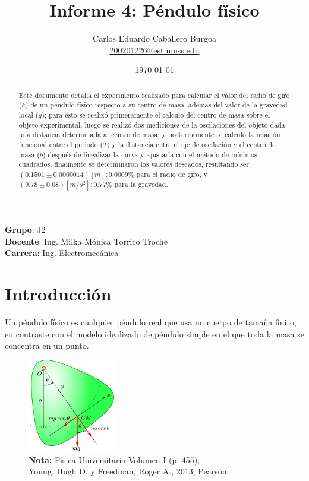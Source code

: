 \documentclass[letter,11pt]{article}
\title{Informe 4: Péndulo físico}
\author{Carlos Eduardo Caballero Burgoa \\
    \small{\href{mailto:200201226@est.umss.edu}{200201226@est.umss.edu}}
}
\date{\today}
\newcommand{\source}[1]{\vspace{-11pt} \caption*{\small{\textbf{Nota:} {#1}}}}
\begin{document}
\maketitle
\begin{center}
    \textbf{Grupo}: J2\\
    \textbf{Docente}: Ing. Milka Mónica Torrico Troche\\
    \textbf{Carrera}: Ing. Electromecánica
\end{center}

\begin{abstract}
Este documento detalla el experimento realizado para calcular el valor del radio
de giro ($k$) de un péndulo físico respecto a su centro de masa, además del
valor de la gravedad local ($g$); para esto se realizó primeramente el calculo
del centro de masa sobre el objeto experimental, luego se realizó dos mediciones
de la oscilaciones del objeto dada una distancia determinada al centro de masa;
y posteriormente se calculó la relación funcional entre el periodo ($T$) y la
distancia entre el eje de oscilación y el centro de masa ($b$) después de
linealizar la curva y ajustarla con el método de mínimos cuadrados, finalmente
se determinaron los valores deseados, resultando ser:
$(0.1501 \pm 0.0000014) [m]; 0.0009\%$ para el radio de giro, y
$(9.78 \pm 0.08) [m/s^2]; 0.77\%$ para la gravedad.
\end{abstract}

\section{Introducción}

Un péndulo físico es cualquier péndulo real que usa un cuerpo de tamaña finito,
en contraste con el modelo idealizado de péndulo simple en el que toda la masa
se concentra en un punto.

\begin{figure}
\centering
\includegraphics[width=0.34\textwidth]{resources/f1.eps}
\caption{Dinámica de un péndulo físico.}
\label{figura1}
\source{Física Universitaria Volumen I (p. 455), \\
Young, Hugh D. y Freedman, Roger A., 2013, Pearson.}
\end{figure}
\end{document}
